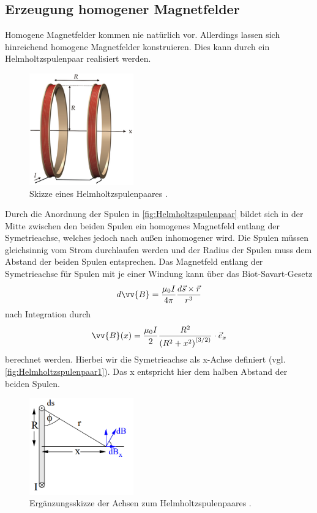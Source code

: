 \subsection{Erzeugung homogener Magnetfelder}
\label{subsec:HomogeneMagnetfelder}
Homogene Magnetfelder kommen nie natürlich vor. Allerdings lassen sich hinreichend homogene Magnetfelder konstruieren. Dies kann durch ein Helmholtzspulenpaar realisiert werden.
\begin{figure}
	\centering
    \includegraphics[width=0.4\textwidth]{content/Helmholtz_coils.png}
	\caption{Skizze eines Helmholtzspulenpaares \cite{Helmholtzspulenpaar}.}
	\label{fig:Helmholtzspulenpaar}
\end{figure}
Durch die Anordnung der Spulen in \autoref{fig:Helmholtzspulenpaar} bildet sich in der Mitte zwischen den beiden Spulen ein homogenes Magnetfeld entlang der Symetrieachse, welches 
jedoch nach außen inhomogener wird. Die Spulen müssen gleichsinnig vom Strom durchlaufen werden und der Radius der Spulen muss dem Abstand der beiden Spulen entsprechen. 
Das Magnetfeld entlang der Symetrieachse für Spulen mit je einer Windung kann über das Biot-Savart-Gesetz
\begin{equation}
    \label{eqn:diff_Biot-Savart}
    d\vv{B} = \frac{\mu_0 I}{4\pi}\frac{d\vec{s}\times\vec{r}}{r^3}
\end{equation}
nach Integration durch
\begin{equation}
    \label{eqn:Biot-Savart_1}
    \vv{B}(x) = \frac{\mu_0 I}{2}\frac{R^2}{\left(R^2 + x^2 \right)^{(3/2)}}\cdot \vec{e}_x
\end{equation}
berechnet werden. Hierbei wir die Symetrieachse als x-Achse definiert (vgl. \autoref{fig:Helmholtzspulenpaar1}). Das \dq x\dq \: entspricht hier dem halben Abstand der beiden Spulen. 
\begin{figure}
	\centering
    \includegraphics[width=0.4\textwidth]{content/Helmholtzachsen.PNG}
	\caption{Ergänzungsskizze der Achsen zum Helmholtzspulenpaares  \cite{v105}.}
	\label{fig:Helmholtzspulenpaar1}
\end{figure}
